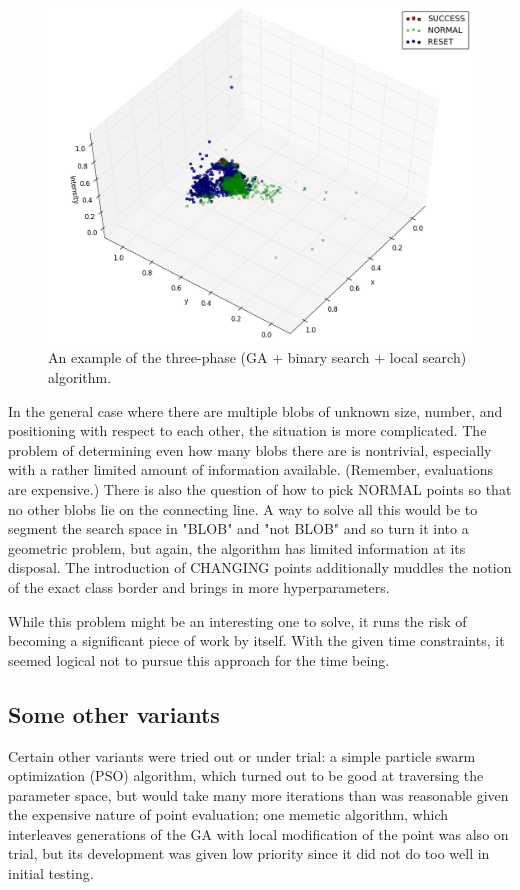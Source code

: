 \documentclass[times, utf8, diplomski]{fer}
\begin{document}
\begin{figure}[htbp]
    \centering
    \includegraphics[width=\textwidth]{images/GA-binary-local.png}
    \caption{An example of the three-phase (GA + binary search + local search)
             algorithm.
    }
    \label{fig:three-phase-example}
\end{figure}


In the general case where there are multiple blobs of unknown size, number,
and positioning with respect to each other, the situation is more complicated.
The problem of determining even how many blobs there are is nontrivial,
especially with a rather limited amount of information available. (Remember,
evaluations are expensive.) There is also the question of how to pick NORMAL
points so that no other blobs lie on the connecting line. A way to solve all
this would be to segment the search space in "BLOB" and "not BLOB" and so turn
it into a geometric problem, but again, the algorithm has limited information
at its disposal. The introduction of CHANGING points additionally muddles the
notion of the exact class border and brings in more hyperparameters. 

While this problem might be an interesting one to solve, it runs the risk of
becoming a significant piece of work by itself. With the given time constraints,
it seemed logical not to pursue this approach for the time being.


\subsection{Some other variants}
Certain other variants were tried out or under trial: a simple particle swarm
optimization (PSO) algorithm, which turned out to be good at traversing the
parameter space, but would take many more iterations than was reasonable given
the expensive nature of point evaluation; one memetic algorithm, which interleaves
generations of the GA with local modification of the point was also on trial, but
its development was given low priority since it did not do too well in initial
testing.
\end{document}

